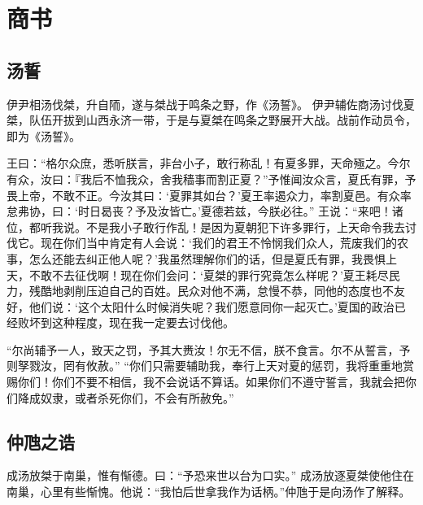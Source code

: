 \documentclass[a4paper,12pt,UTF8,twoside]{ctexbook}
\begin{document}
\part{商书}

\chapter{汤誓}

伊尹相汤伐桀，升自陑，遂与桀战于鸣条之野，作《汤誓》。
伊尹辅佐商汤讨伐夏桀，队伍开拔到山西永济一带，于是与夏桀在鸣条之野展开大战。战前作动员令，即为《汤誓》。

王曰：“格尔众庶，悉听朕言，非台小子，敢行称乱！有夏多罪，天命殛之。今尔有众，汝曰：『我后不恤我众，舍我穑事而割正夏？”予惟闻汝众言，夏氏有罪，予畏上帝，不敢不正。今汝其曰：‘夏罪其如台？’夏王率遏众力，率割夏邑。有众率怠弗协，曰：‘时日曷丧？予及汝皆亡。’夏德若兹，今朕必往。”
王说：“来吧！诸位，都听我说。不是我小子敢行作乱！是因为夏朝犯下许多罪行，上天命令我去讨伐它。现在你们当中肯定有人会说：‘我们的君王不怜悯我们众人，荒废我们的农事，怎么还能去纠正他人呢？’我虽然理解你们的话，但是夏氏有罪，我畏惧上天，不敢不去征伐啊！现在你们会问：‘夏桀的罪行究竟怎么样呢？’夏王耗尽民力，残酷地剥削压迫自己的百姓。民众对他不满，怠慢不恭，同他的态度也不友好，他们说：‘这个太阳什么时候消失呢？我们愿意同你一起灭亡。’夏国的政治已经败坏到这种程度，现在我一定要去讨伐他。

“尔尚辅予一人，致天之罚，予其大赉汝！尔无不信，朕不食言。尔不从誓言，予则孥戮汝，罔有攸赦。”
“你们只需要辅助我，奉行上天对夏的惩罚，我将重重地赏赐你们！你们不要不相信，我不会说话不算话。如果你们不遵守誓言，我就会把你们降成奴隶，或者杀死你们，不会有所赦免。”

\chapter{仲虺之诰}

成汤放桀于南巢，惟有惭德。曰：“予恐来世以台为口实。”
成汤放逐夏桀使他住在南巢，心里有些惭愧。他说：“我怕后世拿我作为话柄。”仲虺于是向汤作了解释。
\end{document}
